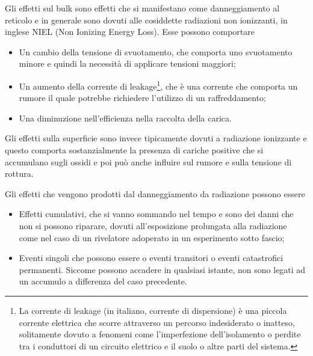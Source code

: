 Gli effetti sul bulk sono effetti che si manifestano come danneggiamento al reticolo e in generale sono dovuti alle cosiddette radiazioni non ionizzanti, in inglese NIEL (Non Ionizing Energy Loss). Esse possono comportare
\begin{itemize}[leftmargin=0.5cm]
   \item Un cambio della tensione di svuotamento, che comporta uno svuotamento minore e quindi la necessità di applicare tensioni maggiori;
   \item Un aumento della corrente di leakage\footnote{La corrente di leakage (in italiano, corrente di dispersione) è una piccola corrente elettrica che scorre attraverso un percorso indesiderato o inatteso, solitamente dovuto a fenomeni come l'imperfezione dell'isolamento o perdite tra i conduttori di un circuito elettrico e il suolo o altre parti del sistema.}, che è una corrente che comporta un rumore il quale potrebbe richiedere l'utilizzo di un raffreddamento;
   \item Una diminuzione nell'efficienza nella raccolta della carica.
\end{itemize}


Gli effetti sulla superficie sono invece tipicamente dovuti a radiazione ionizzante e questo comporta sostanzialmente la presenza di cariche positive che si accumulano sugli ossidi e poi può anche influire sul rumore e sulla tensione di rottura.

Gli effetti che vengono prodotti dal danneggiamento da radiazione possono essere
\begin{itemize}[leftmargin=0.5cm]
   \item Effetti cumulativi, che si vanno sommando nel tempo e sono dei danni che non si possono riparare, dovuti all'esposizione prolungata alla radiazione come nel caso di un rivelatore adoperato in un esperimento sotto fascio;
   \item Eventi singoli che possono essere o eventi transitori o eventi catastrofici permanenti. Siccome possono accadere in qualsiasi istante, non sono legati ad un accumulo a differenza del caso precedente.
\end{itemize}

